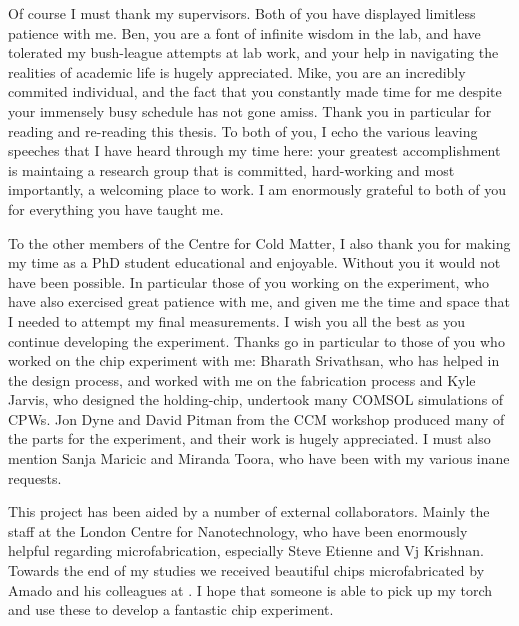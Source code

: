 \begin{singlespace}
Of course I must thank my supervisors. Both of you have displayed limitless
patience with me. Ben, you are a font of infinite wisdom in the lab, and have
tolerated my bush-league attempts at lab work, and your help in navigating the
realities of academic life is hugely appreciated. Mike, you are an incredibly
commited individual, and the fact that you constantly made time for me despite
your immensely busy schedule has not gone amiss. Thank you in particular for
reading and re-reading this thesis.
%
To both of you, I echo the various leaving speeches that I have heard through
my time here: your greatest accomplishment is maintaing a research group that
is committed, hard-working and most importantly, a welcoming place to work.
I am enormously grateful to both of you for everything you have taught me.

To the other members of the Centre for Cold Matter, I also thank you for making
my time as a PhD student educational and enjoyable. Without you it would not
have been possible. In particular those of you working on the \CaF{}
experiment, who have also exercised great patience with me, and given me
the time and space that I needed to attempt my final measurements. I wish you
all the best as you continue developing the experiment. Thanks go in particular
to those of you who worked on the chip experiment with me:
Bharath Srivathsan, who has helped in the design process, and worked
with me on the fabrication process and  Kyle Jarvis, who designed the holding-chip,
undertook many COMSOL simulations of CPWs. Jon Dyne and David Pitman from the
CCM workshop produced many of the parts for the experiment, and their work is
hugely appreciated.
%
I must also mention Sanja Maricic
and Miranda Toora, who have been  with my various inane
requests.

This project has been aided by a number of external collaborators. Mainly the
staff at the London Centre for Nanotechnology, who have been enormously helpful
regarding microfabrication, especially Steve Etienne and Vj Krishnan. Towards
the end of my studies we received beautiful chips microfabricated by Amado
 and his colleagues at . I hope
that someone is able to pick up my torch and use these to develop a fantastic
\CaF{} chip experiment.


\end{singlespace}
